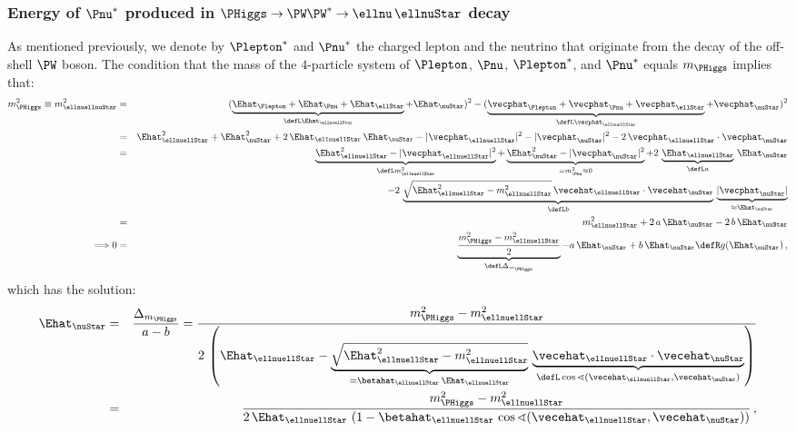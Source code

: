 \subsubsection{Energy of $\Pnu^{\ast}$ produced in $\PHiggs \to \PW\PW^{\ast} \to \ellnu \, \ellnuStar$ decay}
\label{sec:appendix_nuEn_Hww}

As mentioned previously, we denote by $\Plepton^{\ast}$ and $\Pnu^{\ast}$ the charged lepton and the neutrino that originate from the decay of the off-shell $\PW$ boson.
The condition that the mass of the $4$-particle system of $\Plepton$, $\Pnu$, $\Plepton^{\ast}$, and $\Pnu^{\ast}$ equals $m_{\PHiggs}$ implies that:
\begin{eqnarray}
m_{\PHiggs}^{2} \equiv m_{\ellnuellnuStar}^{2} 
 & = & ( \underbrace{\Ehat_{\Plepton} + \Ehat_{\Pnu} + \Ehat_{\ellStar}}_{\defL \Ehat_{\ellnuellStar}} + \Ehat_{\nuStar} )^{2} 
- ( \underbrace{\vecphat_{\Plepton} + \vecphat_{\Pnu} + \vecphat_{\ellStar}}_{\defL \vecphat_{\ellnuellStar}} + \vecphat_{\nuStar} )^{2} \nonumber \\
 & = & \Ehat_{\ellnuellStar}^{2} + \Ehat_{\nuStar}^{2} + 2 \, \Ehat_{\ellnuellStar} \, \Ehat_{\nuStar} 
- |\vecphat_{\ellnuellStar}|^{2} - |\vecphat_{\nuStar}|^{2} - 2 \, \vecphat_{\ellnuellStar} \cdot \vecphat_{\nuStar} \nonumber \\
 & = & \underbrace{\Ehat_{\ellnuellStar}^{2} - |\vecphat_{\ellnuellStar}|^{2}}_{\defL m_{\ellnuellStar}^{2}} 
+ \underbrace{\Ehat_{\nuStar}^{2} - |\vecphat_{\nuStar}|^{2}}_{= m_{\Pnu}^{2} \approx 0} 
+ 2 \, \underbrace{\Ehat_{\ellnuellStar}}_{\defL a} \, \Ehat_{\nuStar} \nonumber \\
 & & \quad - 2 \, \underbrace{\sqrt{\Ehat_{\ellnuellStar}^{2} - m_{\ellnuellStar}^{2}} \, \vecehat_{\ellnuellStar} \cdot \vecehat_{\nuStar}}_{\defL b} \, 
 \underbrace{|\vecphat_{\nuStar}|}_{\approx \Ehat_{\nuStar}} \nonumber \\
 & = & m_{\ellnuellStar}^{2} + 2 \, a \, \Ehat_{\nuStar} - 2 \, b \, \Ehat_{\nuStar} \nonumber \\
\Longrightarrow 0 & = & \underbrace{\frac{m_{\PHiggs}^{2} - m_{\ellnuellStar}^{2}}{2}}_{\defL \Delta_{m_{\PHiggs}}} - a \, \Ehat_{\nuStar} + b \, \Ehat_{\nuStar}
  \defR g(\Ehat_{\nuStar}) \, ,
\label{eq:nuEn_Hww1}
\end{eqnarray}
which has the solution:
\begin{eqnarray}
\Ehat_{\nuStar}
 & = & \frac{\Delta_{m_{\PHiggs}}}{a - b} 
 = \frac{m_{\PHiggs}^{2} - m_{\ellnuellStar}^{2}}{2 \, \left( \Ehat_{\ellnuellStar} 
- \underbrace{\sqrt{\Ehat_{\ellnuellStar}^{2} - m_{\ellnuellStar}^{2}}}_{= \betahat_{\ellnuellStar} \, \Ehat_{\ellnuellStar}} \,
 \underbrace{\vecehat_{\ellnuellStar} \cdot \vecehat_{\nuStar}}_{\defL \cos\sphericalangle(\vecehat_{\ellnuellStar},\vecehat_{\nuStar})} \right)} \nonumber \\
 & = & \frac{m_{\PHiggs}^{2} - m_{\ellnuellStar}^{2}}{2 \, \Ehat_{\ellnuellStar} \, 
\left( 1 - \betahat_{\ellnuellStar} \, \cos\sphericalangle(\vecehat_{\ellnuellStar},\vecehat_{\nuStar}) \right)} \, ,
\label{eq:nuEn_Hww2}
\end{eqnarray}
